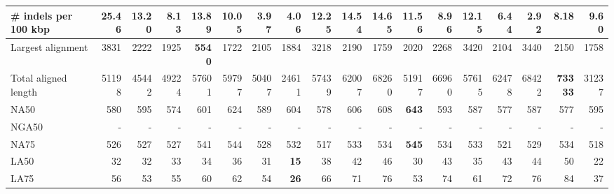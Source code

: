 \documentclass[12pt,a4paper]{article}
\begin{document}
\begin{table}[ht]
\begin{center}
\begin{tabular}{|l*{17}{|r}|}
\# indels per 100 kbp & 25.46 & 13.20 & 8.13 & 13.89 & 10.05 & 3.97 & 4.06 & 12.25 & 14.54 & 14.65 & 11.56 & 8.96 & 12.15 & 6.44 & {\bf 2.92} & 8.18 & 9.60 \\ \hline
Largest alignment & 3831 & 2222 & 1925 & {\bf 5540} & 1722 & 2105 & 1884 & 3218 & 2190 & 1759 & 2020 & 2268 & 3420 & 2104 & 3440 & 2150 & 1758 \\ \hline
Total aligned length & 51198 & 45442 & 49224 & 57601 & 59797 & 50407 & 24611 & 57439 & 62007 & 68260 & 51917 & 66960 & 57615 & 62478 & 68422 & {\bf 73333} & 31237 \\ \hline
NA50 & 580 & 595 & 574 & 601 & 624 & 589 & 604 & 578 & 606 & 608 & {\bf 643} & 593 & 587 & 577 & 587 & 577 & 595 \\ \hline
NGA50 & - & - & - & - & - & - & - & - & - & - & - & - & - & - & - & - & - \\ \hline
NA75 & 526 & 527 & 527 & 541 & 544 & 528 & 532 & 517 & 533 & 534 & {\bf 545} & 534 & 533 & 521 & 529 & 534 & 518 \\ \hline
LA50 & 32 & 32 & 33 & 34 & 36 & 31 & {\bf 15} & 38 & 42 & 46 & 30 & 43 & 35 & 43 & 44 & 50 & 22 \\ \hline
LA75 & 56 & 53 & 55 & 60 & 62 & 54 & {\bf 26} & 66 & 71 & 76 & 53 & 74 & 61 & 72 & 76 & 84 & 37 \\ \hline
\end{tabular}
\end{center}
\end{table}
\end{document}
